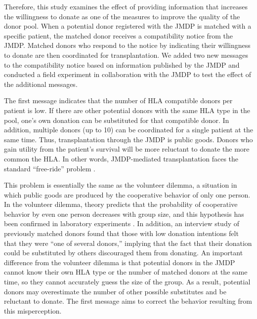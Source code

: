 \documentclass[
]{article}
\begin{document}
Therefore, this study examines the effect of providing information that increases the willingness to donate as one of the measures to improve the quality of the donor pool. When a potential donor registered with the JMDP is matched with a specific patient, the matched donor receives a compatibility notice from the JMDP. Matched donors who respond to the notice by indicating their willingness to donate are then coordinated for transplantation. We added two new messages to the compatibility notice based on information published by the JMDP and conducted a field experiment in collaboration with the JMDP to test the effect of the additional messages.

The first message indicates that the number of HLA compatible donors per patient is low. If there are other potential donors with the same HLA type in the pool, one's own donation can be substituted for that compatible donor. In addition, multiple donors (up to 10) can be coordinated for a single patient at the same time. Thus, transplantation through the JMDP is public goods. Donors who gain utility from the patient's survival will be more reluctant to donate the more common the HLA. In other words, JMDP-mediated transplantation faces the standard ``free-ride'' problem \citep{Bergstrom2009}.

This problem is essentially the same as the volunteer dilemma, a situation in which public goods are produced by the cooperative behavior of only one person. In the volunteer dilemma, theory predicts that the probability of cooperative behavior by even one person decreases with group size, and this hypothesis has been confirmed in laboratory experiments \citep{Diekmann1985, Diekmann1986, Franzen1999, Davis2017}. In addition, an interview study of previously matched donors \citep{Kurosawa2022} found that those with low donation intentions felt that they were ``one of several donors,'' implying that the fact that their donation could be substituted by others discouraged them from donating. An important difference from the volunteer dilemma is that potential donors in the JMDP cannot know their own HLA type or the number of matched donors at the same time, so they cannot accurately guess the size of the group. As a result, potential donors may overestimate the number of other possible substitutes and be reluctant to donate. The first message aims to correct the behavior resulting from this misperception.
\end{document}
